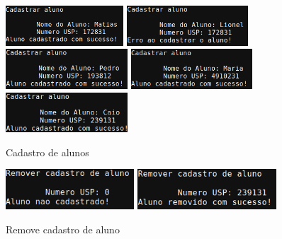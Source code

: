 \documentclass[12pt,a4paper,portuguese]{article}
\begin{document}
        \begin{figure}[H]
            \centering
            \includegraphics[height=1.5cm]{imgs/cadastra_aluno_1.png}
            \includegraphics[height=1.5cm]{imgs/cadastra_aluno_2.png}
            \includegraphics[height=1.5cm]{imgs/cadastra_aluno_3.png}
            \includegraphics[height=1.5cm]{imgs/cadastra_aluno_4.png}
            \includegraphics[height=1.5cm]{imgs/cadastra_aluno_5.png}
            \caption{Cadastro de alunos}
        \end{figure}

        \begin{figure}[H]
            \centering
            \includegraphics[height=1.5cm]{imgs/remove_cadastro_1.png}
            \includegraphics[height=1.5cm]{imgs/remove_cadastro_2.png}
            \caption{Remove cadastro de aluno}
        \end{figure}
\end{document}
